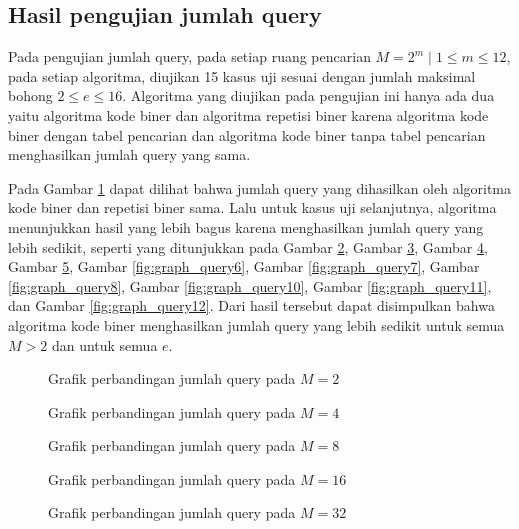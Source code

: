 \subsection{Hasil pengujian jumlah query}

Pada pengujian jumlah query, pada setiap ruang pencarian $M=2^m \mid 1 \leq m \leq 12$, pada setiap algoritma, diujikan 15 kasus uji sesuai dengan jumlah maksimal bohong $2 \leq e \leq 16$. Algoritma yang diujikan pada pengujian ini hanya ada dua yaitu algoritma kode biner dan algoritma repetisi biner karena algoritma kode biner dengan tabel pencarian dan algoritma kode biner tanpa tabel pencarian menghasilkan jumlah query yang sama.

Pada Gambar \ref{fig:graph_query1} dapat dilihat bahwa jumlah query yang dihasilkan oleh algoritma kode biner dan repetisi biner sama. Lalu untuk kasus uji selanjutnya, algoritma menunjukkan hasil yang lebih bagus karena menghasilkan jumlah query yang lebih sedikit, seperti yang ditunjukkan pada Gambar \ref{fig:graph_query2}, Gambar \ref{fig:graph_query3}, Gambar \ref{fig:graph_query4}, Gambar \ref{fig:graph_query5}, Gambar \ref{fig:graph_query6}, Gambar \ref{fig:graph_query7}, Gambar \ref{fig:graph_query8}, Gambar \ref{fig:graph_query10}, Gambar \ref{fig:graph_query11}, dan Gambar \ref{fig:graph_query12}. Dari hasil tersebut dapat disimpulkan bahwa algoritma kode biner menghasilkan jumlah query yang lebih sedikit untuk semua $M > 2$ dan untuk semua $e$.

\begin{figure}
\centering
{}
\caption{Grafik perbandingan jumlah query pada $M=2$}
\label{fig:graph_query1}
\end{figure}

\begin{figure}
\centering
{}
\caption{Grafik perbandingan jumlah query pada $M=4$}
\label{fig:graph_query2}
\end{figure}

\begin{figure}
\centering
{}
\caption{Grafik perbandingan jumlah query pada $M=8$}
\label{fig:graph_query3}
\end{figure}

\begin{figure}
\centering
{}
\caption{Grafik perbandingan jumlah query pada $M=16$}
\label{fig:graph_query4}
\end{figure}

\begin{figure}
\centering
{}
\caption{Grafik perbandingan jumlah query pada $M=32$}
\label{fig:graph_query5}
\end{figure}

